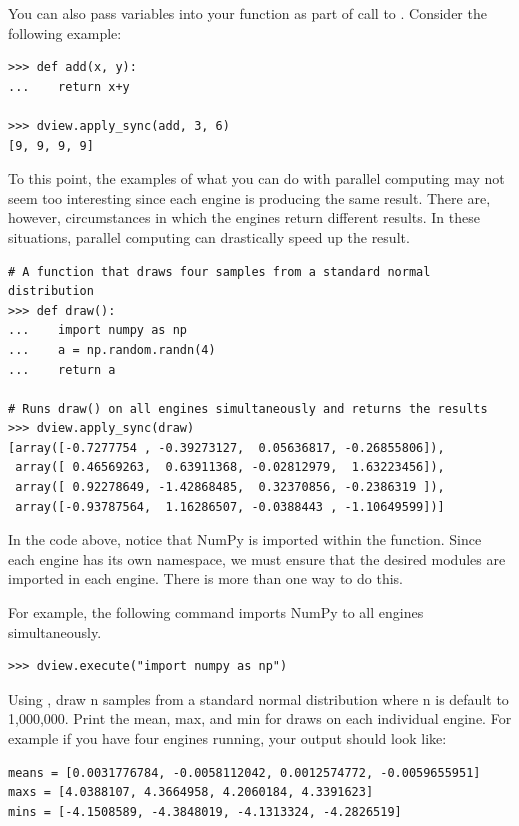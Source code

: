 You can also pass variables into your function as part of call to .
Consider the following example:

\begin{lstlisting}
>>> def add(x, y):
...    return x+y

>>> dview.apply_sync(add, 3, 6)
[9, 9, 9, 9]
\end{lstlisting}

To this point, the examples of what you can do with parallel computing may not seem too interesting since each engine is producing the same result.
There are, however, circumstances in which the engines return different results.
In these situations, parallel computing can drastically speed up the result.

\begin{lstlisting}
# A function that draws four samples from a standard normal distribution
>>> def draw():
...    import numpy as np
...    a = np.random.randn(4)
...    return a

# Runs draw() on all engines simultaneously and returns the results
>>> dview.apply_sync(draw)
[array([-0.7277754 , -0.39273127,  0.05636817, -0.26855806]),
 array([ 0.46569263,  0.63911368, -0.02812979,  1.63223456]),
 array([ 0.92278649, -1.42868485,  0.32370856, -0.2386319 ]),
 array([-0.93787564,  1.16286507, -0.0388443 , -1.10649599])]

\end{lstlisting}

\begin{info}
In the code above, notice that NumPy is imported within the function. 
Since each engine has its own namespace, we must ensure that the desired modules are imported in each engine.
There is more than one way to do this. 

For example, the following command imports NumPy to all engines simultaneously.

\begin{lstlisting}
>>> dview.execute("import numpy as np")
\end{lstlisting}
\end{info}

\begin{problem}
Using , draw n samples from a standard normal distribution where n is default to 1,000,000.
Print the mean, max, and min for draws on each individual engine. 
For example if you have four engines running, your output should look like:
\begin{lstlisting}
means = [0.0031776784, -0.0058112042, 0.0012574772, -0.0059655951]
maxs = [4.0388107, 4.3664958, 4.2060184, 4.3391623]
mins = [-4.1508589, -4.3848019, -4.1313324, -4.2826519]
\end{lstlisting}
\end{problem}

